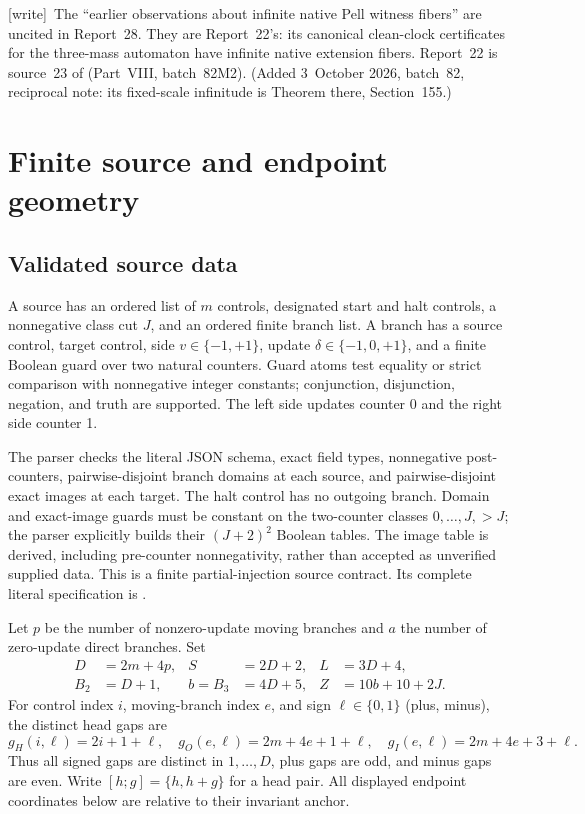 \documentclass[11pt,a4paper]{article}
\numberwithin{equation}{section}
\newcommand{\file}[1]{\texttt{\detokenize{#1}}}
\newcommand{\wtag}{\textup{[write]}}
\begin{document}
\wtag\ The ``earlier observations about infinite native Pell witness fibers'' are uncited in Report~28. They are Report~22's: its canonical clean-clock certificates for the three-mass automaton have infinite native extension fibers. Report~22 is source~23 of  (Part~VIII, batch~82M2). (Added 3~October 2026, batch~82, reciprocal note: its fixed-scale infinitude is Theorem  there, Section~155.)

\section{Finite source and endpoint geometry}\label{fpa:pq:sec:geometry}
\subsection{Validated source data}
A source has an ordered list of $m$ controls, designated start and halt controls, a nonnegative class cut $J$, and an ordered finite branch list. A branch has a source control, target control, side $v\in\{-1,+1\}$, update $\delta\in\{-1,0,+1\}$, and a finite Boolean guard over two natural counters. Guard atoms test equality or strict comparison with nonnegative integer constants; conjunction, disjunction, negation, and truth are supported. The left side updates counter 0 and the right side counter 1.

The parser checks the literal JSON schema, exact field types, nonnegative post-counters, pairwise-disjoint branch domains at each source, and pairwise-disjoint exact images at each target. The halt control has no outgoing branch. Domain and exact-image guards must be constant on the two-counter classes $0,\ldots,J,>J$; the parser explicitly builds their $(J+2)^2$ Boolean tables. The image table is derived, including pre-counter nonnegativity, rather than accepted as unverified supplied data. This is a finite partial-injection source contract. Its complete literal specification is \file{research/references/SOURCE_SCHEMA.md}.

Let $p$ be the number of nonzero-update moving branches and $a$ the number of zero-update direct branches. Set
\begin{align*}
D&=2m+4p,& S&=2D+2,& L&=3D+4,\\
B_2&=D+1,& b=B_3&=4D+5,& Z&=10b+10+2J.
\end{align*}
For control index $i$, moving-branch index $e$, and sign $\ell\in\{0,1\}$ (plus, minus), the distinct head gaps are
\[
g_H(i,\ell)=2i+1+\ell,\quad
g_O(e,\ell)=2m+4e+1+\ell,\quad
g_I(e,\ell)=2m+4e+3+\ell.
\]
Thus all signed gaps are distinct in $1,\ldots,D$, plus gaps are odd, and minus gaps are even. Write $[h;g]=\{h,h+g\}$ for a head pair. All displayed endpoint coordinates below are relative to their invariant anchor.
\end{document}
